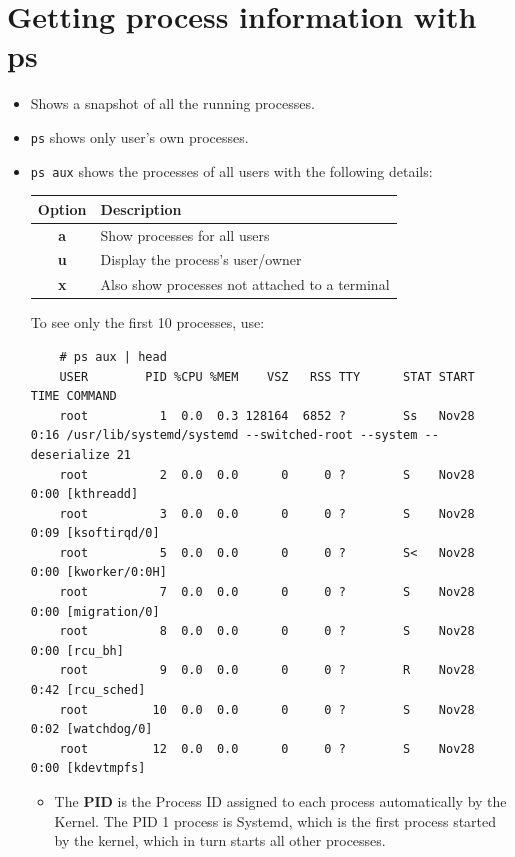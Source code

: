 	\section{Getting process information with ps}
\begin{itemize}
	\item Shows a snapshot of all the running processes.
	\item \verb|ps| shows only user's own processes. 
	
	\item \verb|ps aux| shows the processes of all users with the following details:
	
	\begin{tabular}{cM{0.75}}
		\toprule
		\textbf{Option} &\textbf{Description} \\
		\midrule
		\textbf{a} &Show processes for all users \\
		\textbf{u} &Display the process's user/owner \\
		\textbf{x} &Also show processes not attached to a terminal \\
		\bottomrule
	\end{tabular}
	
	\noindent
	To see only the first 10 processes, use:
	\vspace{-15pt}
	\begin{verbatim}
	# ps aux | head
	USER        PID %CPU %MEM    VSZ   RSS TTY      STAT START   TIME COMMAND
	root          1  0.0  0.3 128164  6852 ?        Ss   Nov28   0:16 /usr/lib/systemd/systemd --switched-root --system --deserialize 21
	root          2  0.0  0.0      0     0 ?        S    Nov28   0:00 [kthreadd]
	root          3  0.0  0.0      0     0 ?        S    Nov28   0:09 [ksoftirqd/0]
	root          5  0.0  0.0      0     0 ?        S<   Nov28   0:00 [kworker/0:0H]
	root          7  0.0  0.0      0     0 ?        S    Nov28   0:00 [migration/0]
	root          8  0.0  0.0      0     0 ?        S    Nov28   0:00 [rcu_bh]
	root          9  0.0  0.0      0     0 ?        R    Nov28   0:42 [rcu_sched]
	root         10  0.0  0.0      0     0 ?        S    Nov28   0:02 [watchdog/0]
	root         12  0.0  0.0      0     0 ?        S    Nov28   0:00 [kdevtmpfs]
	\end{verbatim}
	\vspace{-10pt}
	
	\begin{itemize}
		\item The \textbf{PID} is the Process ID assigned to each process automatically by the Kernel. The PID 1 process is Systemd, which is the first process started by the kernel, which in turn starts all other processes.
		

\end{itemize}
\end{itemize}
